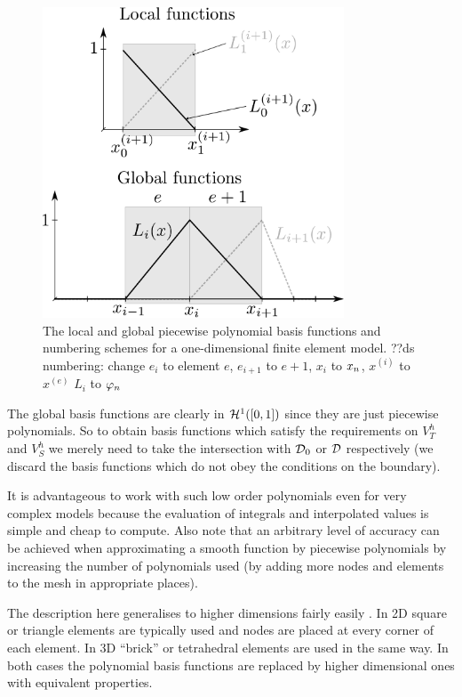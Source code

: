 \begin{figure}
  \center
  \includegraphics[width=0.8\textwidth]{./images/local_global_functions}
  \caption{The local and global piecewise polynomial basis functions and numbering schemes for a one-dimensional finite element model.  ??ds numbering: change $e_i$ to element $e$, $e_{i+1}$ to $e+1$, $x_i$ to $x_n$, $x^(i)$ to $x^(e)$ $L_i$ to $\varphi_n$
  }
  \label{fig:local_global_functions}
\end{figure}

The global basis functions are clearly in $\mathcal{H}^1([0,1])$ since they are just piecewise polynomials.
So to obtain basis functions which satisfy the requirements on $V_T^h$ and $V_S^h$ we merely need to take the intersection with $\mathcal{D}_0$ or $\mathcal{D}$ respectively (\ie we discard the basis functions which do not obey the conditions on the boundary).

It is advantageous to work with such low order polynomials even for very complex models because the evaluation of integrals and interpolated values is simple and cheap to compute.
Also note that an arbitrary level of accuracy can be achieved when approximating a smooth function by piecewise polynomials by increasing the number of polynomials used (\ie by adding more nodes and elements to the mesh in appropriate places).

The description here generalises to higher dimensions fairly easily \cite[20]{HowardElmanDavidSilvester2006}.
In 2D square or triangle elements are typically used and nodes are placed at every corner of each element.
In 3D ``brick'' or tetrahedral elements are used in the same way.
In both cases the polynomial basis functions are replaced by higher dimensional ones with equivalent properties.

